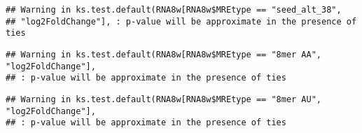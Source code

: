 \documentclass[
]{article}
\newenvironment{Shaded}{\begin{snugshade}}{\end{snugshade}}
\newcommand{\FunctionTok}[1]{\textcolor[rgb]{0.13,0.29,0.53}{\textbf{#1}}}
\newcommand{\NormalTok}[1]{#1}
\newcommand{\OtherTok}[1]{\textcolor[rgb]{0.56,0.35,0.01}{#1}}
\newcommand{\SpecialCharTok}[1]{\textcolor[rgb]{0.81,0.36,0.00}{\textbf{#1}}}
\newcommand{\StringTok}[1]{\textcolor[rgb]{0.31,0.60,0.02}{#1}}
\begin{document}
\begin{verbatim}
## Warning in ks.test.default(RNA8w[RNA8w$MREtype == "seed_alt_38",
## "log2FoldChange"], : p-value will be approximate in the presence of ties
\end{verbatim}

\begin{Shaded}
\end{Shaded}

\begin{verbatim}
## Warning in ks.test.default(RNA8w[RNA8w$MREtype == "8mer AA", "log2FoldChange"],
## : p-value will be approximate in the presence of ties
\end{verbatim}

\begin{Shaded}
\end{Shaded}

\begin{verbatim}
## Warning in ks.test.default(RNA8w[RNA8w$MREtype == "8mer AU", "log2FoldChange"],
## : p-value will be approximate in the presence of ties
\end{verbatim}

\begin{Shaded}
\end{Shaded}
\end{document}
